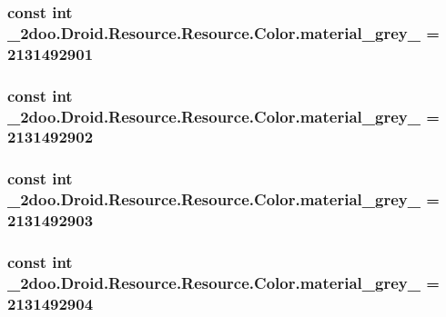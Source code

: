 \hypertarget{class__2doo_1_1_droid_1_1_resource_1_1_color_3fa3a1e56f73d0ea11a4857be4bff80d}{
\subsubsection[{material\_\-grey\_\-300}]{\setlength{\rightskip}{0pt plus 5cm}const int \_\-2doo.Droid.Resource.Resource.Color.material\_\-grey\_ = 2131492901}}
\label{class__2doo_1_1_droid_1_1_resource_1_1_color_3fa3a1e56f73d0ea11a4857be4bff80d}


\hypertarget{class__2doo_1_1_droid_1_1_resource_1_1_color_39d427a81014fe106384260251259078}{
\subsubsection[{material\_\-grey\_\-50}]{\setlength{\rightskip}{0pt plus 5cm}const int \_\-2doo.Droid.Resource.Resource.Color.material\_\-grey\_ = 2131492902}}
\label{class__2doo_1_1_droid_1_1_resource_1_1_color_39d427a81014fe106384260251259078}


\hypertarget{class__2doo_1_1_droid_1_1_resource_1_1_color_f1374f8076dd591a9d15f310ff5f609b}{
\subsubsection[{material\_\-grey\_\-600}]{\setlength{\rightskip}{0pt plus 5cm}const int \_\-2doo.Droid.Resource.Resource.Color.material\_\-grey\_ = 2131492903}}
\label{class__2doo_1_1_droid_1_1_resource_1_1_color_f1374f8076dd591a9d15f310ff5f609b}


\hypertarget{class__2doo_1_1_droid_1_1_resource_1_1_color_594551e5b19b7d734cc5ca86cad629c4}{
\subsubsection[{material\_\-grey\_\-800}]{\setlength{\rightskip}{0pt plus 5cm}const int \_\-2doo.Droid.Resource.Resource.Color.material\_\-grey\_ = 2131492904}}
\label{class__2doo_1_1_droid_1_1_resource_1_1_color_594551e5b19b7d734cc5ca86cad629c4}


